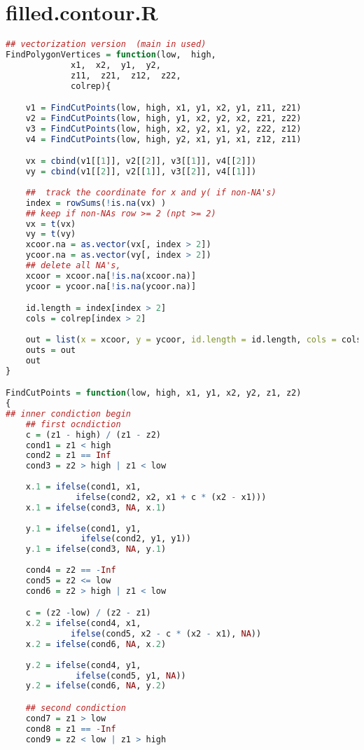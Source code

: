 \documentclass{report}
\begin{document}
\section{filled.contour.R}
\begin{lstlisting}[language = R]
## vectorization version  (main in used)
FindPolygonVertices = function(low,  high,
		     x1,  x2,  y1,  y2,
		     z11,  z21,  z12,  z22,
             colrep){

    v1 = FindCutPoints(low, high, x1, y1, x2, y1, z11, z21)
    v2 = FindCutPoints(low, high, y1, x2, y2, x2, z21, z22)
    v3 = FindCutPoints(low, high, x2, y2, x1, y2, z22, z12)
    v4 = FindCutPoints(low, high, y2, x1, y1, x1, z12, z11)

    vx = cbind(v1[[1]], v2[[2]], v3[[1]], v4[[2]])
    vy = cbind(v1[[2]], v2[[1]], v3[[2]], v4[[1]])
    
    ##  track the coordinate for x and y( if non-NA's)
    index = rowSums(!is.na(vx) )
    ## keep if non-NAs row >= 2 (npt >= 2)
    vx = t(vx)
    vy = t(vy)
    xcoor.na = as.vector(vx[, index > 2])
    ycoor.na = as.vector(vy[, index > 2])
    ## delete all NA's,
    xcoor = xcoor.na[!is.na(xcoor.na)]
    ycoor = ycoor.na[!is.na(ycoor.na)]

    id.length = index[index > 2]
    cols = colrep[index > 2]
    
    out = list(x = xcoor, y = ycoor, id.length = id.length, cols = cols)
    outs = out
    out
}

FindCutPoints = function(low, high, x1, y1, x2, y2, z1, z2)
{
## inner condiction begin
    ## first ocndiction
    c = (z1 - high) / (z1 - z2)
    cond1 = z1 < high
    cond2 = z1 == Inf
    cond3 = z2 > high | z1 < low
    
    x.1 = ifelse(cond1, x1, 
              ifelse(cond2, x2, x1 + c * (x2 - x1)))
    x.1 = ifelse(cond3, NA, x.1)
                
    y.1 = ifelse(cond1, y1, 
               ifelse(cond2, y1, y1))
    y.1 = ifelse(cond3, NA, y.1)
    
    cond4 = z2 == -Inf
    cond5 = z2 <= low
    cond6 = z2 > high | z1 < low

    c = (z2 -low) / (z2 - z1)
    x.2 = ifelse(cond4, x1,
             ifelse(cond5, x2 - c * (x2 - x1), NA))
    x.2 = ifelse(cond6, NA, x.2)
             
    y.2 = ifelse(cond4, y1,
              ifelse(cond5, y1, NA))
    y.2 = ifelse(cond6, NA, y.2)

    ## second condiction
    cond7 = z1 > low
    cond8 = z1 == -Inf
    cond9 = z2 < low | z1 > high
    

\end{lstlisting}
\end{document}
